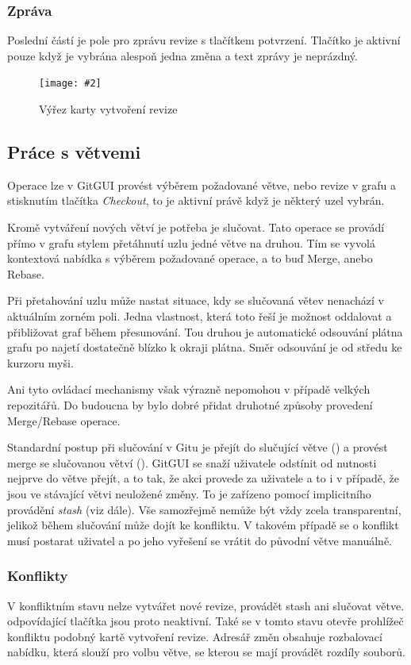\documentclass[
  biblatex,
  glossaries,
  index
]{kidiplom}
\newcommand{\pic}[4]{
\begin{figure}[h]
\centering
\texttt{[image: \#2]}
\caption{#3}
\label{fig:#4}
\end{figure}}
\begin{document}
\subsubsection{Zpráva}
Poslední částí je pole pro zprávu revize s tlačítkem potvrzení. Tlačítko je aktivní pouze když je vybrána alespoň jedna změna a text zprávy je neprázdný.

\pic{10cm}{create-commit.png}{Výřez karty vytvoření revize}{}

\subsection{Práce s větvemi}
Operace  lze v GitGUI provést výběrem požadované větve, nebo revize v grafu a stisknutím tlačítka {\it Checkout}, to je aktivní právě když je některý uzel vybrán.

Kromě vytváření nových větví je potřeba je slučovat. Tato operace se provádí přímo v grafu stylem přetáhnutí uzlu jedné větve na druhou. Tím se vyvolá kontextová nabídka s výběrem požadované operace, a to buď Merge, anebo Rebase.

Při přetahování uzlu může nastat situace, kdy se slučovaná větev nenachází v aktuálním zorném poli. Jedna vlastnost, která toto řeší je možnost oddalovat a přibližovat graf během přesunování. Tou druhou je automatické odsouvání plátna grafu po najetí dostatečně blízko k okraji plátna. Směr odsouvání je od středu ke kurzoru myši.

Ani tyto ovládací mechanismy však výrazně nepomohou v případě velkých repozitářů. Do budoucna by bylo dobré přidat druhotné způsoby provedení Merge/Rebase operace.

Standardní postup při slučování v Gitu je přejít do slučující větve () a provést merge se slučovanou větví (). GitGUI se snaží uživatele odstínit od nutnosti nejprve do větve přejít, a to tak, že akci provede za uživatele a to i v případě, že jsou ve stávající větvi neuložené změny. To je zařízeno pomocí implicitního provádění {\it stash} (viz dále). Vše samozřejmě nemůže být vždy zcela transparentní, jelikož během slučování může dojít ke konfliktu. V takovém případě se o konflikt musí postarat uživatel a po jeho vyřešení se vrátit do původní větve manuálně.

\subsubsection{Konflikty}
V konfliktním stavu nelze vytvářet nové revize, provádět stash ani slučovat větve. odpovídající tlačítka jsou proto neaktivní. Také se v tomto stavu otevře prohlížeč konfliktu podobný kartě vytvoření revize. Adresář změn obsahuje rozbalovací nabídku, která slouží pro volbu větve, se kterou se mají provádět rozdíly souborů.
\end{document}
